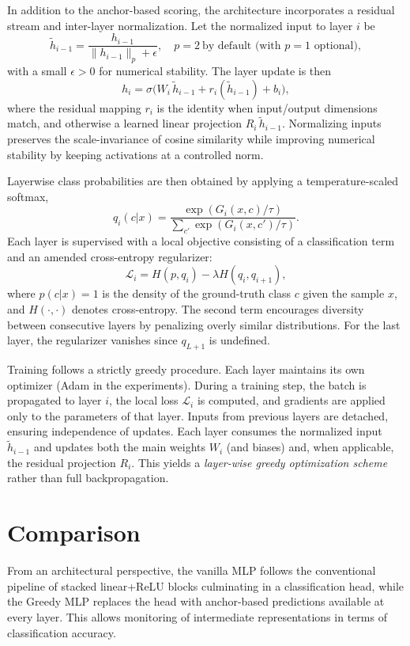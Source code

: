 \documentclass[11pt]{article}
\begin{document}
In addition to the anchor-based scoring, the architecture incorporates a residual stream and inter-layer normalization. Let the normalized input to layer $i$ be
\[
  \tilde{h}_{i-1} = \frac{h_{i-1}}{\|h_{i-1}\|_p + \epsilon},\quad p=2\ \text{by default (with $p=1$ optional)},
\]
with a small $\epsilon>0$ for numerical stability. The layer update is then
\[
  h_i = \sigma\big(W_i \, \tilde{h}_{i-1} + r_i(\tilde{h}_{i-1}) + b_i\big),
\]
where the residual mapping $r_i$ is the identity when input/output dimensions match, and otherwise a learned linear projection $R_i\,\tilde{h}_{i-1}$. Normalizing inputs preserves the scale-invariance of cosine similarity while improving numerical stability by keeping activations at a controlled norm.

Layerwise class probabilities are then obtained by applying a temperature-scaled softmax,
\[
  q_i(c|x) = \frac{\exp(G_i(x,c)/\tau)}{\sum_{c'} \exp(G_i(x,c')/\tau)}.
\]
Each layer is supervised with a local objective consisting of a classification term and an amended cross-entropy regularizer:
\[
  \mathcal{L}_i = H(p, q_i) - \lambda H(q_i, q_{i+1}),
\]
where $p(c|x)=1$ is the density of the ground-truth class $c$ given the sample $x$, and $H(\cdot,\cdot)$ denotes cross-entropy. The second term encourages diversity between consecutive layers by penalizing overly similar distributions. For the last layer, the regularizer vanishes since $q_{L+1}$ is undefined.

Training follows a strictly greedy procedure. Each layer maintains its own optimizer (Adam in the experiments). During a training step, the batch is propagated to layer $i$, the local loss $\mathcal{L}_i$ is computed, and gradients are applied only to the parameters of that layer. Inputs from previous layers are detached, ensuring independence of updates. Each layer consumes the normalized input $\tilde{h}_{i-1}$ and updates both the main weights $W_i$ (and biases) and, when applicable, the residual projection $R_i$. This yields a \emph{layer-wise greedy optimization scheme} rather than full backpropagation.

\section{Comparison}
From an architectural perspective, the vanilla MLP follows the conventional pipeline of stacked linear+ReLU blocks culminating in a classification head, while the Greedy MLP replaces the head with anchor-based predictions available at every layer. This allows monitoring of intermediate representations in terms of classification accuracy.
\end{document}
